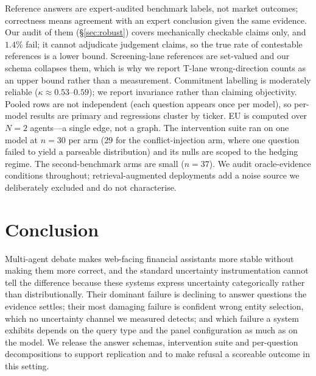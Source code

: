 \documentclass[sigconf,anonymous,review]{acmart}
\begin{document}
Reference answers are expert-audited benchmark labels, not market outcomes;
correctness means agreement with an expert conclusion given the same
evidence. Our audit of them (\S\ref{sec:robust}) covers mechanically
checkable claims only, and $1.4\%$ fail; it cannot adjudicate judgement
claims, so the true rate of contestable references is a lower bound.
Screening-lane references are set-valued and our schema collapses them,
which is why we report T-lane wrong-direction counts as an upper bound
rather than a measurement. Commitment labelling is moderately reliable
($\kappa \approx 0.53$--$0.59$); we report invariance rather than claiming
objectivity. Pooled
rows are not independent (each question appears once per model), so per-model
results are primary and regressions cluster by ticker. EU is computed over
$N{=}2$ agents---a single edge, not a graph. The intervention suite ran on one
model at $n{=}30$ per arm ($29$ for the conflict-injection arm, where one question failed to yield a parseable distribution) and its nulls are scoped to the hedging regime. The
second-benchmark arms are small ($n{=}37$). We audit oracle-evidence
conditions throughout; retrieval-augmented deployments add a noise source we
deliberately excluded and do not characterise.

\section{Conclusion}

Multi-agent debate makes web-facing financial assistants more stable without
making them more correct, and the standard uncertainty instrumentation cannot
tell the difference because these systems express uncertainty categorically
rather than distributionally. Their dominant failure is declining to answer
questions the evidence settles; their most damaging failure is confident
wrong entity selection, which no uncertainty channel we measured detects;
and which failure a system exhibits depends on the query type and the panel
configuration as much as on the model. We release the answer schemas,
intervention suite and per-question decompositions to support replication and
to make refusal a scoreable outcome in this setting.



\end{document}
